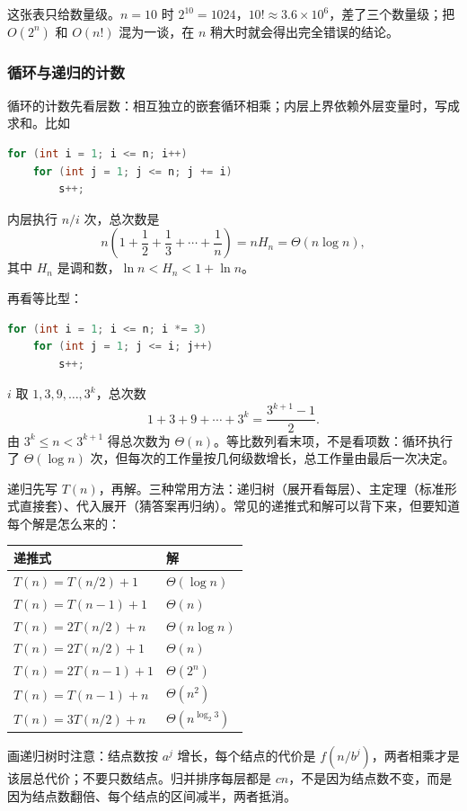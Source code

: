 这张表只给数量级。$n=10$ 时 $2^{10}=1024$，$10!\approx3.6\times10^6$，差了三个数量级；把 $O(2^n)$ 和 $O(n!)$ 混为一谈，在 $n$ 稍大时就会得出完全错误的结论。

\subsubsection{循环与递归的计数}

循环的计数先看层数：相互独立的嵌套循环相乘；内层上界依赖外层变量时，写成求和。比如
\begin{lstlisting}[language=C]
for (int i = 1; i <= n; i++)
    for (int j = 1; j <= n; j += i)
        s++;
\end{lstlisting}
内层执行 $n/i$ 次，总次数是
\[
n\left(1+\frac12+\frac13+\cdots+\frac1n\right)=nH_n=\Theta(n\log n),
\]
其中 $H_n$ 是调和数，$\ln n<H_n<1+\ln n$。

再看等比型：
\begin{lstlisting}[language=C]
for (int i = 1; i <= n; i *= 3)
    for (int j = 1; j <= i; j++)
        s++;
\end{lstlisting}
$i$ 取 $1,3,9,\ldots,3^k$，总次数
\[
1+3+9+\cdots+3^k=\frac{3^{k+1}-1}{2}.
\]
由 $3^k\le n<3^{k+1}$ 得总次数为 $\Theta(n)$。等比数列看末项，不是看项数：循环执行了 $\Theta(\log n)$ 次，但每次的工作量按几何级数增长，总工作量由最后一次决定。

递归先写 $T(n)$，再解。三种常用方法：递归树（展开看每层）、主定理（标准形式直接套）、代入展开（猜答案再归纳）。常见的递推式和解可以背下来，但要知道每个解是怎么来的：

\begin{center}
\begin{tabular}{ll}
\toprule
递推式 & 解 \\
\midrule
$T(n)=T(n/2)+1$ & $\Theta(\log n)$ \\
$T(n)=T(n-1)+1$ & $\Theta(n)$ \\
$T(n)=2T(n/2)+n$ & $\Theta(n\log n)$ \\
$T(n)=2T(n/2)+1$ & $\Theta(n)$ \\
$T(n)=2T(n-1)+1$ & $\Theta(2^n)$ \\
$T(n)=T(n-1)+n$ & $\Theta(n^2)$ \\
$T(n)=3T(n/2)+n$ & $\Theta(n^{\log_2 3})$ \\
\bottomrule
\end{tabular}
\end{center}

画递归树时注意：结点数按 $a^j$ 增长，每个结点的代价是 $f(n/b^j)$，两者相乘才是该层总代价；不要只数结点。归并排序每层都是 $cn$，不是因为结点数不变，而是因为结点数翻倍、每个结点的区间减半，两者抵消。

